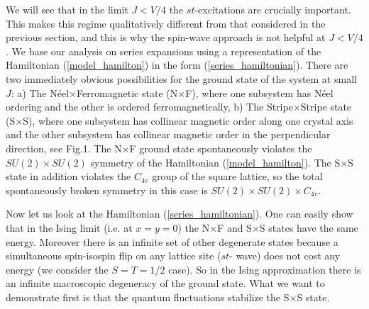 We will see that in the limit $J < V/4$ the $st$-excitations are
crucially important. This makes this regime qualitatively different
from that considered in the previous section, and this is why the
spin-wave approach is not helpful at $J < V/4$. We base our analysis
on series expansions using a representation of the Hamiltonian
(\ref{model_hamilton}) in the form (\ref{series_hamiltonian}).
There are two immediately obvious possibilities for the ground state
of the system at small $J$: a) The N\'eel$\times$Ferromagnetic  state 
(N$\times$F), where one subsystem has  N\'eel ordering and the other is
ordered ferromagnetically, b) The Stripe$\times$Stripe state (S$\times$S),
where one subsystem has collinear magnetic order along one crystal axis
and the other subsystem has collinear magnetic order in the perpendicular
direction, see Fig.1. The N$\times$F ground state spontaneously violates
the $SU(2)\times SU(2)$ symmetry of the Hamiltonian (\ref{model_hamilton}).
The S$\times$S state in addition violates the $C_{4v}$ group of the
square lattice, so the total spontaneously broken symmetry in this
case is $SU(2)\times SU(2)\times C_{4v}$.

Now let us look at the Hamiltonian (\ref{series_hamiltonian}). One can
easily show that in the Ising limit (i.e. at $x=y=0$) the  N$\times$F
and S$\times$S states have the same energy. Moreover there is an infinite
set of other degenerate states because a simultaneous spin-isospin flip on 
any lattice site ($st$- wave) does not cost any energy (we consider the
$S=T=1/2$ case). So  in the 
Ising approximation there is an infinite macroscopic degeneracy of the 
ground state. What we want to demonstrate first is that the quantum
fluctuations stabilize the S$\times$S state.

